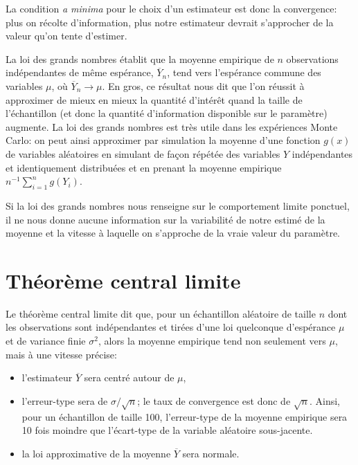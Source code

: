 \documentclass[
  11pt,
  letterpaper,
]{book}
\providecommand{\tightlist}{%
  \setlength{\itemsep}{0pt}\setlength{\parskip}{0pt}}
\theoremstyle{definition}
\theoremstyle{definition}
\theoremstyle{definition}
\theoremstyle{remark}
\begin{document}
La condition \emph{a minima} pour le choix d'un estimateur est donc la convergence: plus on récolte d'information, plus notre estimateur devrait s'approcher de la valeur qu'on tente d'estimer.

La loi des grands nombres établit que la moyenne empirique de \(n\) observations indépendantes de même espérance, \(\overline{Y}_n\), tend vers l'espérance commune des variables \(\mu\), où \(\overline{Y}_n \rightarrow \mu\). En gros, ce résultat nous dit que l'on réussit à approximer de mieux en mieux la quantité d'intérêt quand la taille de l'échantillon (et donc la quantité d'information disponible sur le paramètre) augmente. La loi des grands nombres est très utile dans les expériences Monte Carlo: on peut ainsi approximer par simulation la moyenne d'une fonction \(g(x)\) de variables aléatoires en simulant de façon répétée des variables \(Y\) indépendantes et identiquement distribuées et en prenant la moyenne empirique \(n^{-1} \sum_{i=1}^n g(Y_i)\).

Si la loi des grands nombres nous renseigne sur le comportement limite ponctuel, il ne nous donne aucune information sur la variabilité de notre estimé de la moyenne et la vitesse à laquelle on s'approche de la vraie valeur du paramètre.

\hypertarget{TCL}{%
\section{Théorème central limite}\label{TCL}}

Le théorème central limite dit que, pour un échantillon aléatoire de taille \(n\) dont les observations sont indépendantes et tirées d'une loi quelconque d'espérance \(\mu\) et de variance finie \(\sigma^2\), alors la moyenne empirique tend non seulement vers \(\mu\), mais à une vitesse précise:

\begin{itemize}
\tightlist
\item
  l'estimateur \(\overline{Y}\) sera centré autour de \(\mu\),
\item
  l'erreur-type sera de \(\sigma/\sqrt{n}\); le taux de convergence est donc de \(\sqrt{n}\). Ainsi, pour un échantillon de taille 100, l'erreur-type de la moyenne empirique sera 10 fois moindre que l'écart-type de la variable aléatoire sous-jacente.
\item
  la loi approximative de la moyenne \(\overline{Y}\) sera normale.
\end{itemize}
\end{document}
